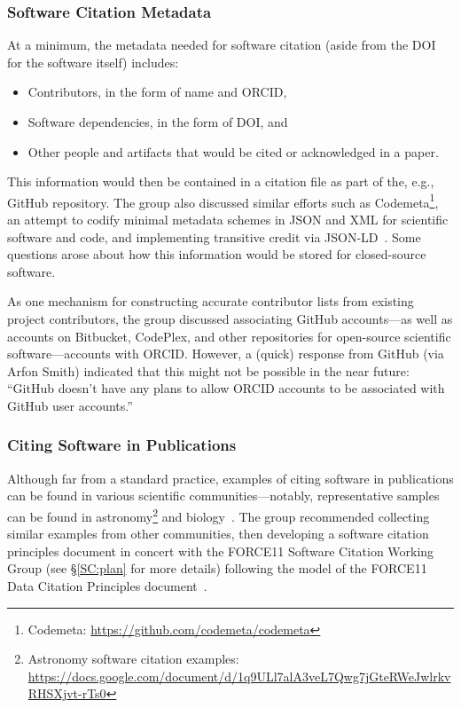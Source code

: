 \subsubsection{Software Citation Metadata}

At a minimum, the metadata needed for software citation (aside from the DOI for the software itself) includes:
\begin{itemize}
    \item Contributors, in the form of name and ORCID,
    \item Software dependencies, in the form of DOI, and
    \item Other people and artifacts that would be cited or acknowledged in a paper.
\end{itemize}
This information would then be contained in a citation file as part of 
the, e.g., GitHub repository.
The group also discussed similar efforts such as Codemeta\footnote{Codemeta: \url{https://github.com/codemeta/codemeta}}, an attempt to codify minimal 
metadata schemes in JSON and XML for scientific software and code, and 
implementing transitive credit via JSON-LD~\cite{wssspe2_katz}.
Some questions arose about how this information would be stored for 
closed-source software.

As one mechanism for constructing accurate contributor lists from existing 
project contributors, the group discussed associating GitHub accounts---as 
well as accounts on Bitbucket, CodePlex, and other repositories for 
open-source scientific software---accounts with ORCID.
However, a (quick) response from GitHub (via Arfon Smith) indicated that 
this might not be possible in the near future: ``GitHub doesn't have any 
plans to allow ORCID accounts to be associated with GitHub user accounts.''

\subsubsection{Citing Software in Publications}

Although far from a standard practice, examples of citing software in 
publications can be found in various scientific communities---notably, 
representative samples can be found in astronomy\footnote{Astronomy software citation examples: \url{https://docs.google.com/document/d/1q9ULl7alA3veL7Qwg7jGteRWeJwlrkvRHSXjvt-rTs0}} and biology~\cite{Howison2015}.
The group recommended collecting similar examples from other communities, then 
developing a software citation principles document in concert with the 
FORCE11 Software Citation Working Group (see \S\ref{SC:plan} for more details) 
following the model of the FORCE11 Data Citation Principles 
document~\cite{DataCitation2014}.

